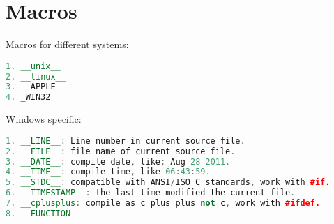 
\chapter{Macros}

Macros for different systems:
\begin{lstlisting}[language=C++]
1. __unix__
2. __linux__
3. __APPLE__
4. _WIN32
\end{lstlisting}

Windows specific:
\begin{lstlisting}[language=C++]
1. __LINE__: Line number in current source file.
2. __FILE__: file name of current source file.
3. __DATE__: compile date, like: Aug 28 2011.
4. __TIME__: compile time, like 06:43:59.
5. __STDC__: compatible with ANSI/ISO C standards, work with #if.
6. __TIMESTAMP__: the last time modified the current file.
7. __cplusplus: compile as c plus plus not c, work with #ifdef.
8. __FUNCTION__
\end{lstlisting}